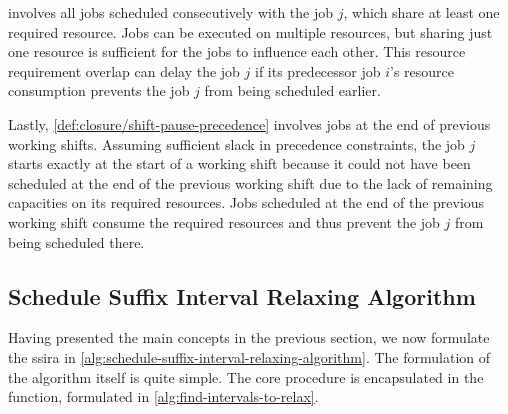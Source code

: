  involves all jobs scheduled consecutively with the job $j$,
which share at least one required resource.
Jobs can be executed on multiple resources,
but sharing just one resource is sufficient for the jobs to influence each other.
This resource requirement overlap can delay the job $j$ if its predecessor job $i$'s resource consumption
prevents the job $j$ from being scheduled earlier.

Lastly, \cref{def:closure/shift-pause-precedence} involves jobs at the end of previous working shifts.
Assuming sufficient slack in precedence constraints,
the job $j$ starts exactly at the start of a working shift because
it could not have been scheduled at the end of the previous working shift
due to the lack of remaining capacities on its required resources.
Jobs scheduled at the end of the previous working shift consume the required resources
and thus prevent the job $j$ from being scheduled there.

\subsection{Schedule Suffix Interval Relaxing Algorithm} \label{subsec:extended-solution/schedule-suffix-interal-relaxing-algorithm}

Having presented the main concepts in the previous section,
we now formulate the \acf{ssira} in \cref{alg:schedule-suffix-interval-relaxing-algorithm}.
The formulation of the algorithm itself is quite simple.
The core procedure is encapsulated in the
 function,
formulated in \cref{alg:find-intervals-to-relax}.


